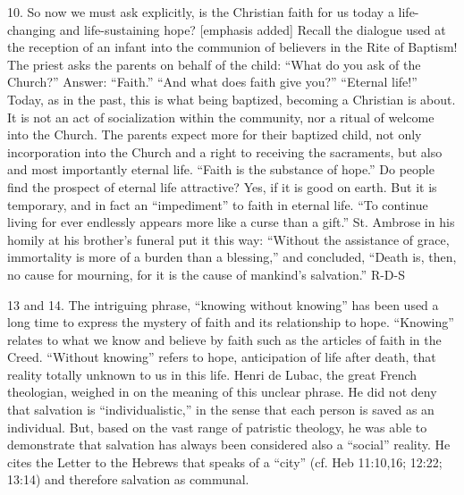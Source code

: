 \documentclass[oneside]{book}
\begin{document}
10. So now we must ask explicitly, is the Christian faith for us today a
life-changing and life-sustaining hope? [emphasis added] Recall the dialogue
used at the reception of an infant into the communion of believers in the Rite
of Baptism! The priest asks the parents on behalf of the child: ``What do you
ask of the Church?'' Answer: ``Faith.'' ``And what does faith give you?''
``Eternal life!'' Today, as in the past, this is what being baptized, becoming a
Christian is about. It is not an act of socialization within the community, nor
a ritual of welcome into the Church.
The parents expect more for their baptized child, not only incorporation into
the Church and a right to receiving the sacraments, but also and most
importantly  eternal life. ``Faith is the substance of hope.'' Do people find
the prospect of eternal life attractive? Yes, if it is good on earth. But it is
temporary, and in fact an ``impediment'' to faith in eternal life. ``To continue
living for ever  endlessly  appears more like a curse than a gift.'' St. Ambrose
in his homily at his brother's funeral put it this way: ``Without the assistance
of grace, immortality is more of a burden than a blessing,'' and concluded,
``Death is, then, no cause for mourning, for it is the cause of mankind's
salvation.''
R-D-S

13 and 14.  The intriguing phrase, ``knowing without knowing'' has been used a
long time to express the mystery of faith and its relationship to
hope. ``Knowing'' relates to what we know and believe by faith such as the
articles of faith in the Creed. ``Without knowing'' refers to hope, anticipation
of life after death, that reality totally unknown to us in this life. Henri de
Lubac, the great French theologian, weighed in on the meaning of this unclear
phrase. He did not deny that salvation is ``individualistic,'' in the sense that
each person is saved as an individual. But, based on the vast range of patristic
theology, he was able to demonstrate that salvation has always been considered
also a ``social'' reality. He cites the Letter to the Hebrews that speaks of a
``city'' (cf. Heb 11:10,16; 12:22; 13:14) and therefore salvation as communal.
\end{document}
